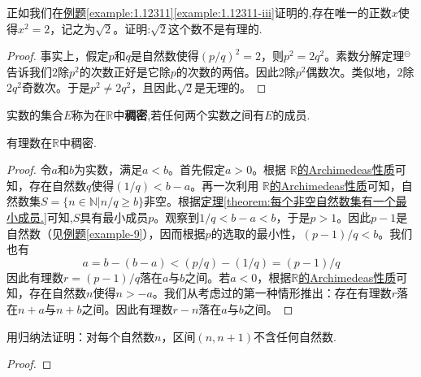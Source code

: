 \documentclass[lang=cn,newtx,10pt,scheme=chinese]{../Template/elegantbook}
\begin{document}
\begin{example}
  正如我们在\hyperref[example:1.12311-iii]{例题\ref{example:1.12311}\ref{example:1.12311-iii}}证明的,存在唯一的正数\(x\)使得\(x^2 = 2\)，记之为\(\sqrt{2}\)。证明:\(\sqrt{2}\)这个数不是有理的.
\end{example}
\begin{proof}
  事实上，假定\(p\)和\(q\)是自然数使得\((p/q)^2 = 2\)，则\(p^2 = 2q^2\)。素数分解定理$^{\ominus}$告诉我们\(2\)除\(p^2\)的次数正好是它除\(p\)的次数的两倍。因此\(2\)除\(p^2\)偶数次。类似地，\(2\)除\(2q^2\)奇数次。于是\(p^2\neq2q^2\)，且因此\(\sqrt{2}\)是无理的。
\end{proof}

\begin{definition}[稠密]\label{definition:稠密}
  实数的集合\(E\)称为在\(\mathbb{R}\)中\textbf{稠密},若任何两个实数之间有\(E\)的成员.
\end{definition}

\begin{theorem}[有理数的稠密性]\label{theorem:有理数的稠密性}
  有理数在\(\mathbb{R}\)中稠密.
\end{theorem}
\begin{proof}
  令\(a\)和\(b\)为实数，满足\(a < b\)。首先假定\(a>0\)。根据 \hyperref[theorem:实数的Archimedeas性质]{\(\mathbb{R}\)的Archimedeas性质}可知，存在自然数\(q\)使得\((1/q)<b - a\)。再一次利用 \hyperref[theorem:实数的Archimedeas性质]{\(\mathbb{R}\)的Archimedeas性质}可知，自然数集\(S=\{n\in\mathbb{N}|n/q\geqslant b\}\)非空。根据\hyperref[theorem:每个非空自然数集有一个最小成员.]{定理\ref{theorem:每个非空自然数集有一个最小成员.}}可知,\(S\)具有最小成员\(p\)。观察到\(1/q<b - a<b\)，于是\(p>1\)。因此\(p - 1\)是自然数（见\hyperref[example-9]{例题\ref{example-9}}），因而根据\(p\)的选取的最小性，\((p - 1)/q<b\)。我们也有
\[
a = b-(b - a)<(p/q)-(1/q)=(p - 1)/q
\]
因此有理数\(r=(p - 1)/q\)落在\(a\)与\(b\)之间。若\(a<0\)，根据\hyperref[theorem:实数的Archimedeas性质]{\(\mathbb{R}\)的Archimedeas性质}可知，存在自然数\(n\)使得\(n>-a\)。我们从考虑过的第一种情形推出：存在有理数\(r\)落在\(n + a\)与\(n + b\)之间。因此有理数\(r - n\)落在\(a\)与\(b\)之间。
\end{proof}

\begin{example}\label{example-1111}
  用归纳法证明：对每个自然数\(n\)，区间\((n, n + 1)\)不含任何自然数.
\end{example}
\begin{proof}
  
\end{proof}
\end{document}
